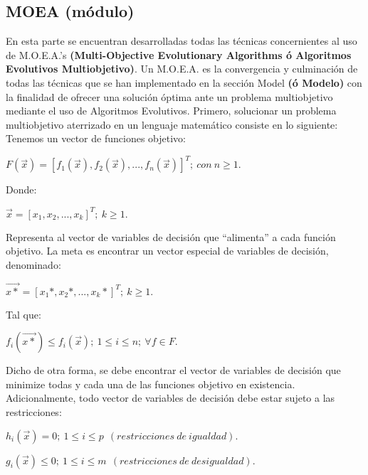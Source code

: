 \documentclass[class=report, crop=false]{standalone}
\begin{document}
\subsection{MOEA (módulo)}
\label{sec:a_2_6}
En esta parte se encuentran desarrolladas todas las 
técnicas concernientes al uso de M.O.E.A.'s \textbf{(Multi-Objective Evolutionary Algorithms
ó Algoritmos Evolutivos Multiobjetivo)}.\medskip\break
Un M.O.E.A. es la convergencia y culminación de todas las 
técnicas que se han implementado en la sección Model 
\textbf{(ó Modelo)} con la finalidad de ofrecer una 
solución óptima ante un problema multiobjetivo mediante el 
uso de Algoritmos Evolutivos.\medskip\break
Primero, solucionar un problema multiobjetivo aterrizado en 
un lenguaje matemático consiste en lo siguiente:\break
Tenemos un vector de funciones objetivo:

\begin{center}\(F(\vec{x}) = [f_1(\vec{x}),f_2(\vec{x}),...,f_n(\vec{x})]^T;\ con\ n \geqslant 1.\)
\end{center}

Donde:

\begin{center}\(\vec{x} = [x_1,x_2,...,x_k]^T;\ k \geqslant 1.\)
\end{center}

Representa al vector de variables de decisión que ``alimenta'' a 
cada función objetivo.\break
La meta es encontrar un vector especial 
de variables de decisión, denominado:

\begin{center}\(\vec{x*} = [x_1*,x_2*,...,x_k*]^T;\ k \geqslant 1.\)
\end{center}

Tal que:

\begin{center}\(f_i(\vec{x*}) \leqslant f_i(\vec{x});\ 1 \leqslant i \leqslant n;\ \forall f \in F\).
\end{center}

Dicho de otra forma, se debe encontrar el vector de variables 
de decisión que minimize todas y cada una de las funciones 
objetivo en existencia.\break
Adicionalmente, todo vector de variables de decisión debe estar 
sujeto a las restricciones:

\begin{center}\(h_i(\vec{x}) = 0;\ 1 \leqslant i \leqslant p\ \ (restricciones\ de\ igualdad).\)
\end{center}
\begin{center}\(g_i(\vec{x}) \leqslant 0;\ 1 \leqslant i \leqslant m\ \ (restricciones\ de\ desigualdad).\)
\end{center}
\end{document}
